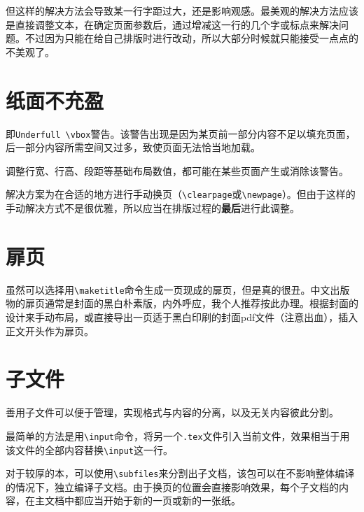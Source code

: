 \documentclass[10pt,openany]{book}
\begin{document}
\begin{sloppypar}
但这样的解决方法会导致某一行字距过大，还是影响观感。最美观的解决方法应该是直接调整文本，在确定页面参数后，通过增减这一行的几个字或标点来解决问题。不过因为只能在给自己排版时进行改动，所以大部分时候就只能接受一点点的不美观了。

\section{纸面不充盈}

即\texttt{Underfull\ \textbackslash{}vbox}警告。该警告出现是因为某页前一部分内容不足以填充页面，后一部分内容所需空间又过多，致使页面无法恰当地加载。

调整行宽、行高、段距等基础布局数值，都可能在某些页面产生或消除该警告。

解决方案为在合适的地方进行手动换页（\texttt{\textbackslash{}clearpage}或\texttt{\textbackslash{}newpage}）。但由于这样的手动解决方式不是很优雅，所以应当在排版过程的\textbf{最后}进行此调整。

\section{扉页}

虽然可以选择用\texttt{\textbackslash{}maketitle}命令生成一页现成的扉页，但是真的很丑。中文出版物的扉页通常是封面的黑白朴素版，内外呼应，我个人推荐按此办理。根据封面的设计来手动布局，或直接导出一页适于黑白印刷的封面pdf文件（注意出血），插入正文开头作为扉页。



\section{子文件}

善用子文件可以便于管理，实现格式与内容的分离，以及无关内容彼此分割。

最简单的方法是用\texttt{\textbackslash{}input}命令，将另一个\texttt{.tex}文件引入当前文件，效果相当于用该文件的全部内容替换\texttt{\textbackslash{}input}这一行。



对于较厚的本，可以使用\texttt{\textbackslash{}subfiles}来分割出子文档，该包可以在不影响整体编译的情况下，独立编译子文档。由于换页的位置会直接影响效果，每个子文档的内容，在主文档中都应当开始于新的一页或新的一张纸。




\end{sloppypar}
\end{document}
